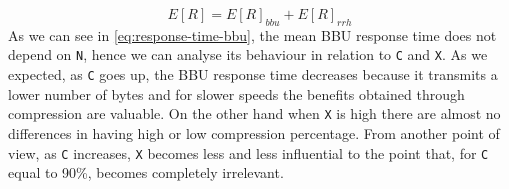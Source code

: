 \documentclass[11pt,a4paper,oneside, openright]{article}
\begin{document}
\begin{equation}
E[R] = E[R]_{bbu} + E[R]_{rrh}
\end{equation} 
As we can see in \eqref{eq:response-time-bbu}, the mean BBU response time does not depend on \texttt{N}, hence we can analyse its behaviour in relation to \texttt{C} and \texttt{X}.
As we expected, as \texttt{C} goes up, the BBU response time decreases because it transmits a lower number of bytes and for slower speeds the benefits obtained through compression are valuable. On the other hand when \texttt{X} is high there are almost no differences in having high or low compression percentage. %
From another point of view, as \texttt{C} increases, \texttt{X} becomes less and less influential to the point that, for \texttt{C} equal to 90\%, becomes completely irrelevant.
\end{document}
